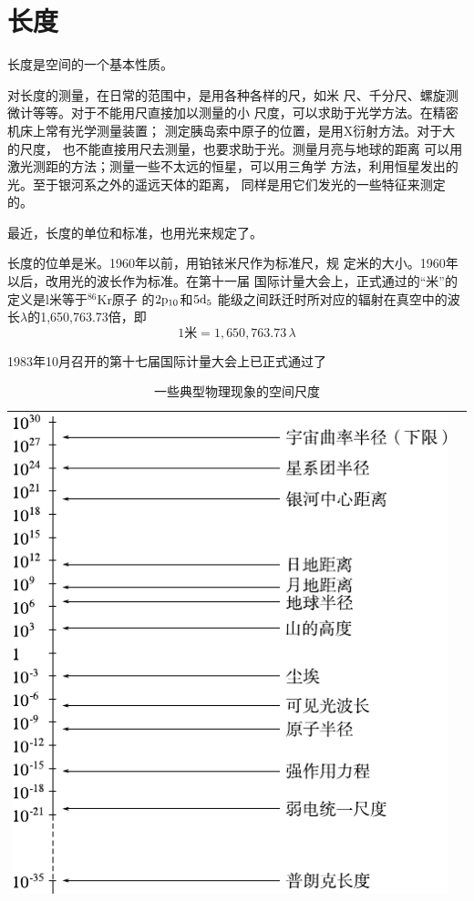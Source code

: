 \section[长度]{长\hspace{3em}度}\label{sec:01.03}

长度是空间的一个基本性质。

对长度的测量，在日常的范围中，是用各种各样的尺，如米
尺、千分尺、螺旋测微计等等。对于不能用尺直接加以测量的小
尺度，可以求助于光学方法。在精密机床上常有光学测量装置；
测定胰岛索中原子的位置，是用X衍射方法。对于大的尺度，
也不能直接用尺去测量，也要求助于光。测量月亮与地球的距离
可以用激光测距的方法；测量一些不太远的恒星，可以用三角学
方法，利用恒星发出的光。至于银河系之外的遥远天体的距离，
同样是用它们发光的一些特征来测定的。

最近，长度的单位和标准，也用光来规定了。

长度的位单是米。1960年以前，用铂铱米尺作为标准尺，规
定米的大小。1960年以后，改用光的波长作为标准。在第十一届
国际计量大会上，正式通过的“米”的定义是l米等于$^{86}$Kr原子
\clearpage\noindent
的$2\rm{p}_{10}$和$5\rm{d}_5$
能级之间跃迁时所对应的辐射在真空中的波长$\lambda$的1,650,763.73倍，即
\begin{equation*}
 1 \text{米} = 1,650,763.73 \, \lambda
\end{equation*}

1983年10月召开的第十七届国际计量大会上已正式通过了
\begin{table}[!h]
 \centering
 \caption{一些典型物理现象的空间尺度}
 \label{tab:01.03}
 \begin{tabular*}{\linewidth}{>{\centering}m{\linewidth}c}
 \toprule
 \includegraphics[width=0.8\linewidth]{figure/tab01.03} & \\
 \bottomrule
 \end{tabular*}
\end{table}
\clearpage

